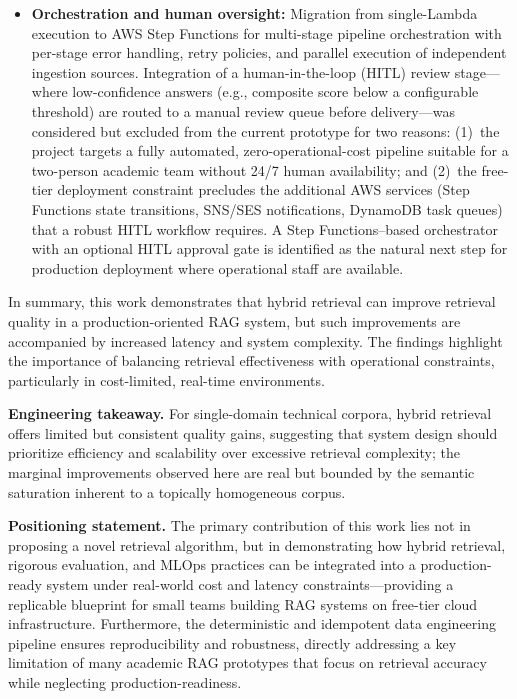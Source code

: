 \begin{itemize}[leftmargin=0.5in]
  \item \textbf{Orchestration and human oversight:} Migration from single-Lambda execution to AWS Step Functions for multi-stage pipeline orchestration with per-stage error handling, retry policies, and parallel execution of independent ingestion sources. Integration of a human-in-the-loop (HITL) review stage---where low-confidence answers (e.g., composite score below a configurable threshold) are routed to a manual review queue before delivery---was considered but excluded from the current prototype for two reasons: (1)~the project targets a fully automated, zero-operational-cost pipeline suitable for a two-person academic team without 24/7 human availability; and (2)~the free-tier deployment constraint precludes the additional AWS services (Step Functions state transitions, SNS/SES notifications, DynamoDB task queues) that a robust HITL workflow requires. A Step Functions--based orchestrator with an optional HITL approval gate is identified as the natural next step for production deployment where operational staff are available.
\end{itemize}

\medskip
\noindent In summary, this work demonstrates that hybrid retrieval can improve retrieval quality in a production-oriented RAG system, but such improvements are accompanied by increased latency and system complexity. The findings highlight the importance of balancing retrieval effectiveness with operational constraints, particularly in cost-limited, real-time environments.

\medskip
\noindent\textbf{Engineering takeaway.} For single-domain technical corpora, hybrid retrieval offers limited but consistent quality gains, suggesting that system design should prioritize efficiency and scalability over excessive retrieval complexity; the marginal improvements observed here are real but bounded by the semantic saturation inherent to a topically homogeneous corpus.

\medskip
\noindent\textbf{Positioning statement.} The primary contribution of this work lies not in proposing a novel retrieval algorithm, but in demonstrating how hybrid retrieval, rigorous evaluation, and MLOps practices can be integrated into a production-ready system under real-world cost and latency constraints---providing a replicable blueprint for small teams building RAG systems on free-tier cloud infrastructure. Furthermore, the deterministic and idempotent data engineering pipeline ensures reproducibility and robustness, directly addressing a key limitation of many academic RAG prototypes that focus on retrieval accuracy while neglecting production-readiness.

